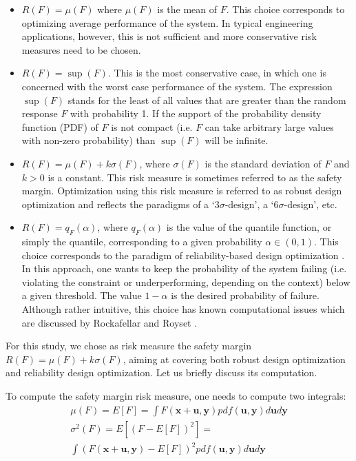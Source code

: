 \documentclass{llncs}
\begin{document}
\begin{itemize}
  \item $R(F)=\mu(F)$ where $\mu(F)$ is the mean of $F$. This choice corresponds to optimizing average performance of the system. In typical engineering applications, however, this is not sufficient and more conservative risk measures need to be chosen.
  \item $R(F)=\sup(F)$. This is the most conservative case, in which one is concerned with the worst case performance of the system. The expression $\sup(F)$ stands for the least of all values that are greater than the random response $F$ with probability 1. If the support of the probability density function (PDF) of $F$ is not compact (i.e. $F$ can take arbitrary large values with non-zero probability) than $\sup(F)$ will be infinite.
  \item $R(F)=\mu(F)+k\sigma(F)$, where $\sigma(F)$ is the standard deviation of $F$ and $k>0$ is a constant. This risk measure is sometimes referred to as the safety margin. Optimization using this risk measure is referred to as robust design optimization \cite{KochYangGu2004,Yao2011,ZhangZhuChenArendt2013} and reflects the paradigms of a ‘$3\sigma$-design’, a ‘$6\sigma$-design’, etc.
  \item $R(F)=q_F(\alpha)$, where $q_F(\alpha)$ is the value of the quantile function, or simply the quantile, corresponding to a given probability $\alpha\in (0,1)$. This choice corresponds to the paradigm of reliability-based design optimization  \cite{AouesChateauneuf2010,Yao2011,YounChoi2004}. In this approach, one wants to keep the probability of the system failing (i.e. violating the constraint or underperforming, depending on the context) below a given threshold. The value $1-\alpha$ is the desired probability of failure. Although rather intuitive, this choice has known computational issues which are discussed by Rockafellar and Royset \cite{RockafellarRoyset2010}.
\end{itemize}

For this study, we chose as risk measure the safety margin $R(F)=\mu(F)+k\sigma(F)$, aiming at covering both robust design optimization and reliability design optimization. Let us briefly discuss its computation.

To compute the safety margin risk measure, one needs to compute two integrals:
\begin{displaymath}
  \begin{array}{c}
    \mu (F)=E[F]=\int F(\pmb x + \pmb u, \pmb y)p df(\pmb u, \pmb y)d\pmb u d\pmb y \\
    \sigma^2(F)=E[(F-E[F])^2]=\\\int(F(\pmb x + \pmb u, \pmb y)-E[F])^2 p df(\pmb u, \pmb y)d\pmb u d\pmb y
  \end{array}
\end{displaymath}
\end{document}
